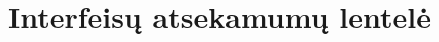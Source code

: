 \documentclass[a4paper,12pt]{article}
\begin{document}

\section{Interfeisų atsekamumų lentelė}
\end{document}
